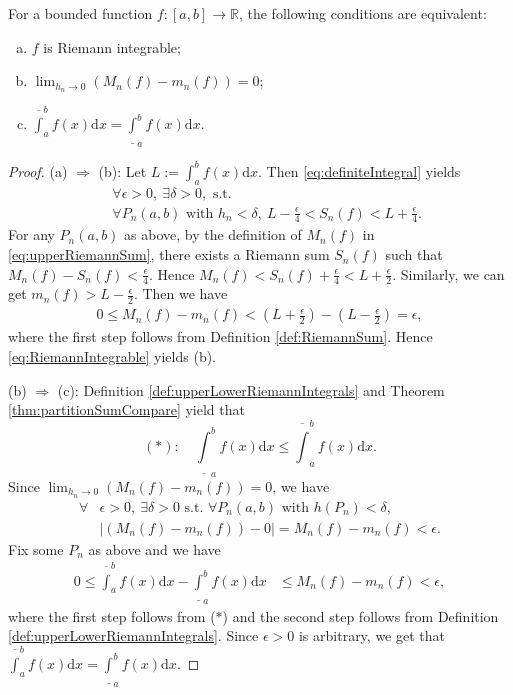 \begin{thm}
  \label{thm:theEquivalenceOfIntegrability}
  For a bounded function $f:[a,b]\rightarrow\mathbb{R}$,
  the following conditions are equivalent:
  \begin{enumerate}[(a)]
  \item $f$ is Riemann integrable;
  \item $\lim_{h_{n}\rightarrow 0}(M_{n}(f)-m_{n}(f))=0$;
  \item $\overline{\int}_{a}^{b}f(x)\mathrm{d}x=
    \underline{\int}_{a}^{b}f(x)\mathrm{d}x$.
  \end{enumerate}
\end{thm}
\begin{proof}
  (a) $\Rightarrow$ (b):
  Let $L:=\int_{a}^{b}f(x)\mathrm{d}x$.
  Then \eqref{eq:definiteIntegral} yields
  \begin{align*}
    &\ \forall \epsilon>0,\ \exists \delta>0,\text{ s.t. }\\
    &\ \forall P_{n}(a,b)\text{ with } h_{n}<\delta,\
      L-\frac{\epsilon}{4}<S_{n}(f)<L+\frac{\epsilon}{4}.
  \end{align*}
  For any $P_{n}(a,b)$ as above,
  by the definition of $M_{n}(f)$ in \eqref{eq:upperRiemannSum},
  there exists a Riemann sum $S_{n}(f)$
  such that $M_{n}(f)-S_{n}(f)<\frac{\epsilon}{4}$.
  Hence $M_{n}(f)<S_{n}(f)+\frac{\epsilon}{4}<L+\frac{\epsilon}{2}$.
  Similarly, we can get $m_{n}(f)>L-\frac{\epsilon}{2}$. Then we have
  \begin{align*}
    0\le M_{n}(f)-m_{n}(f)
    < \left( L+\frac{\epsilon}{2} \right)
    - \left( L-\frac{\epsilon}{2}  \right)=\epsilon,
  \end{align*}
  where the first step follows from Definition \ref{def:RiemannSum}.
  Hence \eqref{eq:RiemannIntegrable} yields (b).
  
  (b) $\Rightarrow$ (c):
  Definition \ref{def:upperLowerRiemannIntegrals} and
  Theorem \ref{thm:partitionSumCompare} yield that
  \begin{displaymath}
    (*):\quad
    \underline{\int}_{a}^{b}f(x)\mathrm{d}x
    \le \overline{\int}_{a}^{b}f(x)\mathrm{d}x.
  \end{displaymath}
  Since
  $\lim_{h_{n}\rightarrow 0}(M_{n}(f)-m_{n}(f))=0$, we have
  \begin{align*}
     \forall &\epsilon>0,\ \exists\delta>0\text{ s.t. }
     \forall P_{n}(a,b)\text{ with } h(P_{n})<\delta,\\
      &|(M_{n}(f)-m_{n}(f))-0|=M_{n}(f)-m_{n}(f)<\epsilon.
  \end{align*}
  Fix some $P_{n}$ as above and we have 
  \begin{align*}
    0\le
    \overline{\int}_{a}^{b}f(x)\mathrm{d}x-
    \underline{\int}_{a}^{b}f(x)\mathrm{d}x
    &\le M_{n}(f)-m_{n}(f)<\epsilon,
  \end{align*}
  where the first step follows from ($*$) and the second step
  follows from Definition \ref{def:upperLowerRiemannIntegrals}.
  Since $\epsilon>0$ is arbitrary, we get that
  $\overline{\int}_{a}^{b}f(x)\mathrm{d}x=
  \underline{\int}_{a}^{b}f(x)\mathrm{d}x$.


\end{proof}

